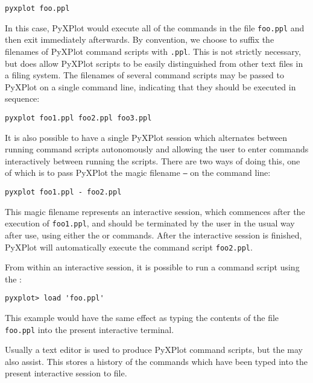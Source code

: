 \begin{verbatim}
pyxplot foo.ppl
\end{verbatim}

\noindent In this case, PyXPlot would execute all of the commands in the file
{\tt foo.ppl} and then exit immediately afterwards. By convention, we choose to
suffix the filenames of PyXPlot command scripts with {\tt .ppl}. This is not
strictly necessary, but does allow PyXPlot scripts to be easily distinguished
from other text files in a filing system. The filenames of several command
scripts may be passed to PyXPlot on a single command line, indicating that they
should be executed in sequence:

\begin{verbatim}
pyxplot foo1.ppl foo2.ppl foo3.ppl
\end{verbatim}

It is also possible to have a single PyXPlot session which alternates between
running command scripts autonomously and allowing the user to enter commands
interactively between running the scripts. There are two ways of doing this,
one of which is to pass PyXPlot the magic filename {\tt --} on the command
line:

\begin{verbatim}
pyxplot foo1.ppl - foo2.ppl
\end{verbatim}

\noindent This magic filename represents an interactive session, which
commences after the execution of {\tt foo1.ppl}, and should be terminated by
the user in the usual way after use, using either the  or
 commands. After the interactive session is finished, PyXPlot
will automatically execute the command script {\tt foo2.ppl}.

From within an interactive session, it is possible to run a command script
using the :

\begin{verbatim}
pyxplot> load 'foo.ppl'
\end{verbatim}

\noindent This example would have the same effect as typing the contents of the
file {\tt foo.ppl} into the present interactive terminal.

Usually a text editor is used to produce PyXPlot command scripts, but the
 may also assist. This stores a history of the commands which
have been typed into the present interactive session to file.

